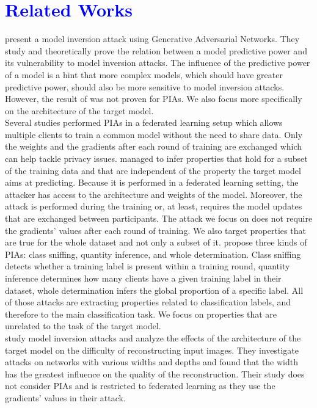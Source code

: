 \documentclass[11pt]{article}
\begin{document}
\section{\textcolor{blue}{Related Works}}

\citet{Zhang2019} present a model inversion attack using Generative Adversarial Networks. They study and theoretically prove the relation between a model predictive power and its vulnerability to model inversion attacks. The influence of the predictive power of a model is a hint that more complex models, which should have greater predictive power, should also be more sensitive to model inversion attacks. However, the result of \citet{Zhang2019} was not proven for PIAs. We also focus more specifically on the architecture of the target model.\\
Several studies \cite{Melis2019, Wang2019} performed PIAs in a federated learning setup which allows multiple clients to train a common model without the need to share data. Only the weights and the gradients after each round of training are exchanged which can help tackle privacy issues. \citet{Melis2019} managed to infer properties that hold for a subset of the training data and that are independent of the property the target model aims at predicting. Because it is performed in a federated learning setting, the attacker has access to the architecture and weights of the model. Moreover, the attack is performed during the training or, at least, requires the model updates that are exchanged between participants. The attack we focus on does not require the gradients' values after each round of training. We also target properties that are true for the whole dataset and not only a subset of it. \citet{Wang2019} propose three kinds of PIAs: class sniffing, quantity inference, and whole determination. Class sniffing detects whether a training label is present within a training round, quantity inference determines how many clients have a given training label in their dataset, whole determination infers the global proportion of a specific label. All of those attacks are extracting properties related to classification labels, and therefore to the main classification task. We focus on properties that are unrelated to the task of the target model.\\
\citet{Geiping2020} study model inversion attacks and analyze the effects of the architecture of the target model on the difficulty of reconstructing input images. They investigate attacks on networks with various widths and depths and found that the width has the greatest influence on the quality of the reconstruction. Their study does not consider PIAs and is restricted to federated learning as they use the gradients' values in their attack.\\
\end{document}
